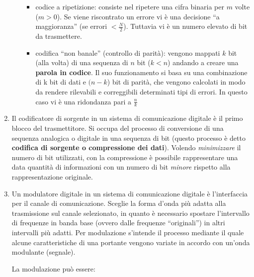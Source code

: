 \documentclass[
]{article}
\begin{document}
\begin{enumerate}
\begin{itemize}
    \begin{itemize}
    \item
      codice a ripetizione: consiste nel ripetere una cifra binaria per
      \(m\) volte (\(m>0\)). Se viene riscontrato un errore vi è una
      decisione ``a maggioranza'' (se errori
      \(\displaystyle < \frac{N}{2}\)). Tuttavia vi è un numero elevato
      di bit da trasmettere.
    \item
      codifica ``non banale'' (controllo di parità): vengono mappati
      \(k\) bit (alla volta) di una sequenza di \(n\) bit (\(k<n\))
      andando a creare una \textbf{parola in codice}. Il suo
      funzionamento si basa su una combinazione di k bit di dati e
      \((n-k\)) bit di parità, che vengono calcolati in modo da rendere
      rilevabili e correggibili determinati tipi di errori. In questo
      caso vi è una ridondanza pari a \(\frac{n}{k}\)
    \end{itemize}
  \end{itemize}
\item
  Il codificatore di sorgente in un sistema di comunicazione digitale è
  il primo blocco del trasmettitore. Si occupa del processo di
  conversione di una sequenza analogica o digitale in una sequenza di
  bit (questo processo è detto \textbf{codifica di sorgente o
  compressione dei dati}). Volendo \emph{minimizzare} il numero di bit
  utilizzati, con la compressione è possibile rappresentare una data
  quantità di informazioni con un numero di bit \emph{minore} rispetto
  alla rappresentazione originale.
\item
  Un modulatore digitale in un sistema di comunicazione digitale è
  l'interfaccia per il canale di comunicazione. Sceglie la forma d'onda
  più adatta alla trasmissione sul canale selezionato, in quanto è
  necessario spostare l'intervallo di frequenze in banda base (ovvero
  dalle frequenze ``originali'') in altri intervalli più adatti.
  \newline Per modulazione s'intende il processo mediante il quale
  alcune caratteristiche di una portante vengono variate in accordo con
  un'onda modulante (segnale).

  La modulazione può essere:


\end{enumerate}
\end{document}
